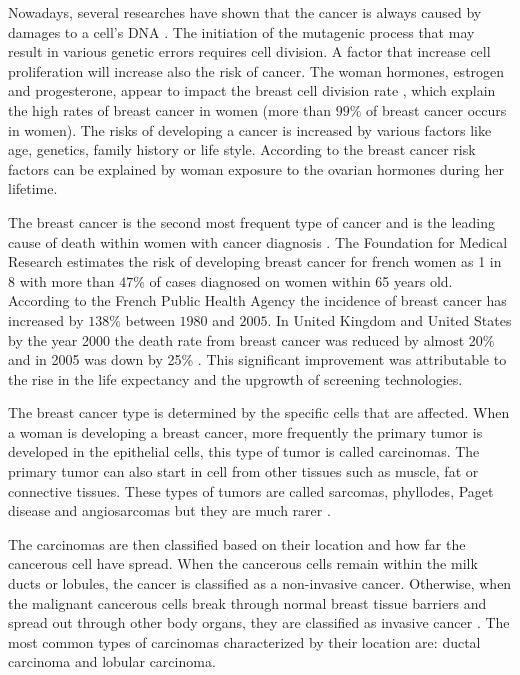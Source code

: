 Nowadays, several researches \citep{pike_estrogens_1993,martin_webmd_2017} have shown that the cancer is always caused by damages to a cell's DNA . The initiation of the mutagenic process that may result in various genetic errors requires cell division.  A factor that increase cell proliferation will increase also the risk of cancer. The woman hormones, estrogen and progesterone, appear to impact the breast cell division rate \citep{ciocca_estrogen_1997,fanelli_estrogen_1996},  which explain the high rates of breast cancer in women (more than $99\%$ of breast cancer occurs in women). The risks of developing a cancer is increased by various factors like age, genetics, family history or life style. According to \citep{martin_webmd_2017} the breast cancer risk factors can be explained by woman exposure to the ovarian hormones during her lifetime.

The breast cancer is the second most frequent type of cancer and is the leading cause of death within women with cancer diagnosis \citep{spf_chiffres_2017}.  The Foundation for Medical Research \citep{frm_chiffres_2017} estimates the risk of developing breast cancer for french women as 1 in 8 with more than $47\%$ of cases diagnosed on women within 65 years old.
According to the French Public Health Agency \cite{spf_chiffres_2017} the incidence of breast cancer has increased by $138\% $ between $1980$ and $2005$. In United Kingdom and United States by the year 2000 the death rate from breast cancer was reduced by almost 20\% and in 2005 was down by 25\% \citep{peto_uk_2000}. This significant improvement was attributable to the rise in the life expectancy and the upgrowth of screening technologies.


The breast cancer type is determined by the specific cells that are affected. 
When a woman is developing a breast cancer, more frequently the primary tumor is developed in the epithelial cells, this type of tumor is called carcinomas. The primary tumor can also start in cell from other tissues such as muscle, fat or connective tissues. These types of tumors are called sarcomas, phyllodes, Paget disease and angiosarcomas but they are much rarer \cite{acs_cancer_2017}. 

The carcinomas are then classified based on their location and how far the cancerous cell have spread. When the cancerous cells remain within the milk ducts or lobules, the cancer is classified as a non-invasive cancer. Otherwise, when the malignant cancerous cells break through normal breast tissue barriers and spread out through other body organs, they are classified as invasive cancer \citep{andolina2011mammographic}. The most common types of carcinomas characterized by their location are: ductal carcinoma and lobular carcinoma. 

